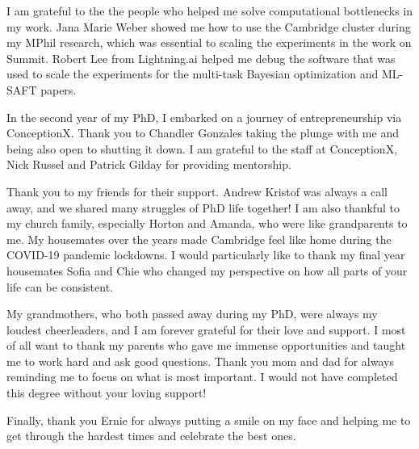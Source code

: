 I am grateful to the the people who helped me solve computational bottlenecks in my work. Jana Marie Weber showed me how to use the Cambridge cluster during my MPhil research, which was essential to scaling the experiments in the work on Summit. Robert Lee from Lightning.ai helped me debug the software that was used to scale the experiments for the multi-task Bayesian optimization and ML-SAFT papers. 

In the second year of my PhD, I embarked on a journey of entrepreneurship  via ConceptionX. Thank you to  Chandler Gonzales taking the plunge with me and being also open to shutting it down.  I am grateful to the staff at ConceptionX, Nick Russel and Patrick Gilday for providing mentorship.  

Thank you to my friends for their support. Andrew Kristof was always a call away, and we shared many struggles of PhD life together! I am also thankful to my church family, especially Horton and Amanda, who were like grandparents to me. My housemates over the years made Cambridge feel like home during the COVID-19 pandemic lockdowns. I would particularly like to thank my final year housemates Sofia and Chie who changed my perspective on how all parts of your life can be consistent. 

My grandmothers, who both passed away during my PhD, were always my loudest cheerleaders, and I am forever grateful for their love and support. I most of all want to thank my parents who gave me immense opportunities and taught me to work hard and ask good questions. Thank you mom and dad for always reminding me to focus on what is most important. I would not have completed this degree without your loving support!

Finally, thank you Ernie for always putting a smile on my face and helping me to get through the hardest times and celebrate the best ones.






